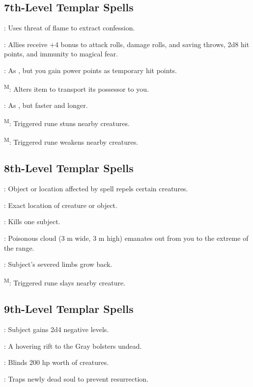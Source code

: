 \subsection{7th-Level Templar Spells}

: Uses threat of flame to extract confession.

: Allies receive +4 bonus to attack rolls, damage rolls, and saving throws, 2d8 hit points, and immunity to magical fear.

: As , but you gain power points as temporary hit points.

\textsuperscript{M}: Alters item to transport its possessor to you.

: As , but faster and longer.

\textsuperscript{M}: Triggered rune stuns nearby creatures.

\textsuperscript{M}: Triggered rune weakens nearby creatures.



\subsection{8th-Level Templar Spells}

: Object or location affected by spell repels certain creatures.

: Exact location of creature or object.

: Kills one subject.

: Poisonous cloud (3 m wide, 3 m high) emanates out from you to the extreme of the range.

: Subject's severed limbs grow back.

\textsuperscript{M}: Triggered rune slays nearby creature.



\subsection{9th-Level Templar Spells}

: Subject gains 2d4 negative levels.

: A hovering rift to the Gray bolsters
undead.

: Blinds 200 hp worth of creatures.

: Traps newly dead soul to prevent
resurrection.